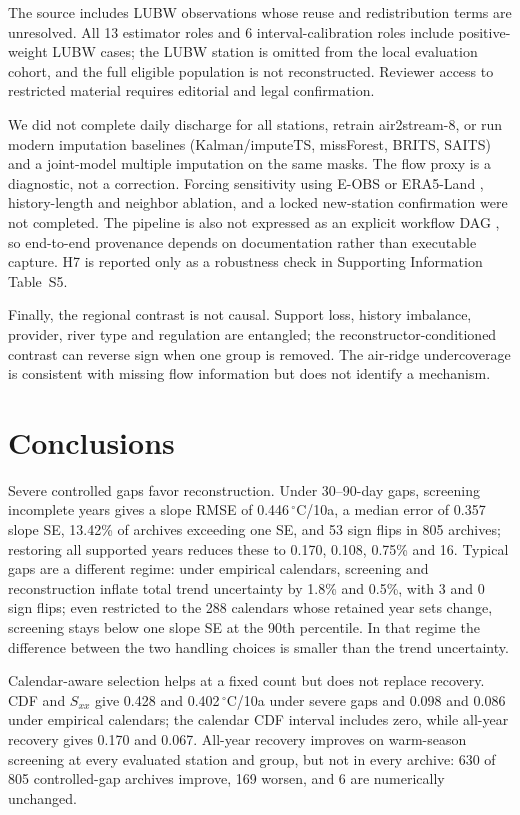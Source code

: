 The source includes LUBW observations whose reuse and redistribution terms are unresolved. All 13 estimator roles and 6 interval-calibration roles include positive-weight LUBW cases; the LUBW station is omitted from the local evaluation cohort, and the full eligible population is not reconstructed. Reviewer access to restricted material requires editorial and legal confirmation.

We did not complete daily discharge for all stations, retrain air2stream-8, or run modern imputation baselines (Kalman/imputeTS, missForest, BRITS, SAITS) and a joint-model multiple imputation on the same masks. The flow proxy is a diagnostic, not a correction. Forcing sensitivity using E-OBS \citep{cornes2018} or ERA5-Land \citep{munoz2021}, history-length and neighbor ablation, and a locked new-station confirmation were not completed. The pipeline is also not expressed as an explicit workflow DAG \citep{molder2021}, so end-to-end provenance depends on documentation rather than executable capture. H7 is reported only as a robustness check in Supporting Information Table~S5.

Finally, the regional contrast is not causal. Support loss, history imbalance, provider, river type and regulation are entangled; the reconstructor-conditioned contrast can reverse sign when one group is removed. The air-ridge undercoverage is consistent with missing flow information but does not identify a mechanism.

\section{Conclusions}

Severe controlled gaps favor reconstruction. Under 30--90-day gaps, screening incomplete years gives a slope RMSE of 0.446\,$^{\circ}$C/10a, a median error of 0.357 slope SE, 13.42\% of archives exceeding one SE, and 53 sign flips in 805 archives; restoring all supported years reduces these to 0.170, 0.108, 0.75\% and 16. Typical gaps are a different regime: under empirical calendars, screening and reconstruction inflate total trend uncertainty by 1.8\% and 0.5\%, with 3 and 0 sign flips; even restricted to the 288 calendars whose retained year sets change, screening stays below one slope SE at the 90th percentile. In that regime the difference between the two handling choices is smaller than the trend uncertainty.

Calendar-aware selection helps at a fixed count but does not replace recovery. CDF and $S_{xx}$ give 0.428 and 0.402\,$^{\circ}$C/10a under severe gaps and 0.098 and 0.086 under empirical calendars; the calendar CDF interval includes zero, while all-year recovery gives 0.170 and 0.067. All-year recovery improves on warm-season screening at every evaluated station and group, but not in every archive: 630 of 805 controlled-gap archives improve, 169 worsen, and 6 are numerically unchanged.

